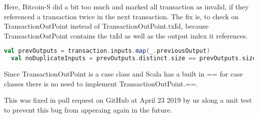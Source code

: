 Here, Bitcoin-S did a bit too much and marked all transaction as invalid, if they referenced a transaction twice in the next transaction.
The fix is, to check on TransactionOutPoint instead of TransactionOutPoint.txId, because TransactionOutPoint contains the txId as well as the output index it references.
\begin{lstlisting}[language=scala]
  val prevOutputs = transaction.inputs.map(_.previousOutput)
  val noDuplicateInputs = prevOutputs.distinct.size == prevOutputs.size
\end{lstlisting}
Since TransactionOutPoint is a case class and Scala has a built in == for case classes there is no need to implement TransactionOutPoint.==.

This was fixed in pull request  on GitHub at April 23 2019 by us along a unit test to prevent this bug from apperaing again in the future.
